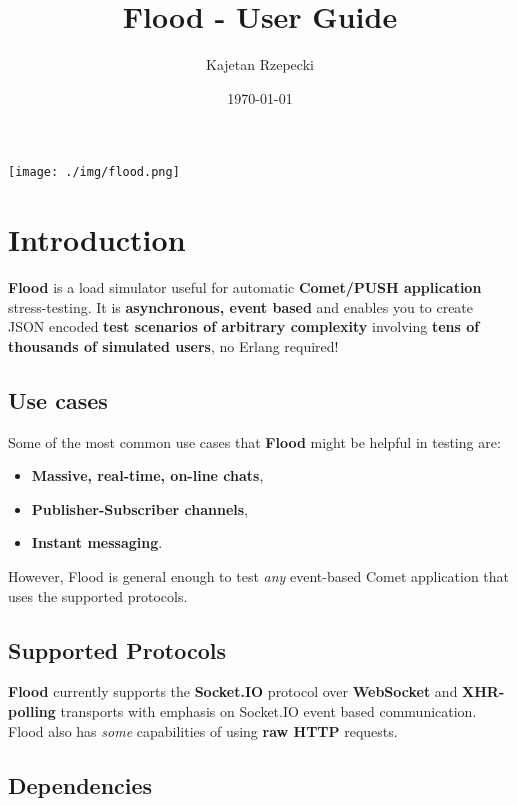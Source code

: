 \documentclass[a4paper]{article}
\title{\textbf{Flood - User Guide}}
\author{Kajetan Rzepecki}
\date{\today}
\begin{document}
\maketitle


\vfill
\begin{center}
\texttt{[image: ./img/flood.png]}
\end{center}

\vfill

\thispagestyle{empty}
\pagebreak

\tableofcontents

\pagebreak
\section{Introduction}
\label{sec-1}

\textbf{Flood} is a load simulator useful for automatic \textbf{Comet/PUSH application} stress-testing. It is \textbf{asynchronous, event based} and enables you to create JSON encoded \textbf{test scenarios of arbitrary complexity} involving \textbf{tens of thousands of simulated users}, no Erlang required!
\subsection{Use cases}
\label{sec-1-1}

Some of the most common use cases that \textbf{Flood} might be helpful in testing are:


\begin{itemize}
\item \textbf{Massive, real-time, on-line chats},
\item \textbf{Publisher-Subscriber channels},
\item \textbf{Instant messaging}.
\end{itemize}

\noindent
However, Flood is general enough to test \emph{any} event-based Comet application that uses the supported protocols.
\subsection{Supported Protocols}
\label{sec-1-2}

\textbf{Flood} currently supports the \textbf{Socket.IO} protocol over \textbf{WebSocket} and \textbf{XHR-polling} transports with emphasis on Socket.IO event based communication. Flood also has \emph{some} capabilities of using \textbf{raw HTTP} requests.
\subsection{Dependencies}
\label{sec-1-3}
\end{document}
